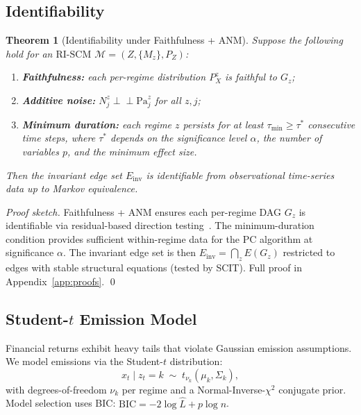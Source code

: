 \documentclass[11pt]{article}
\newtheorem{theorem}{Theorem}
\newcommand{\RISCM}{\text{RI-SCM}}
\newcommand{\cM}{\mathcal{M}}
\begin{document}
\subsection{Identifiability}

\begin{theorem}[Identifiability under Faithfulness + ANM]\label{thm:ident}
Suppose the following hold for an $\RISCM$
$\cM = (Z, \{M_z\}, P_Z)$:
\begin{enumerate}[nosep]
  \item \textbf{Faithfulness:} each per-regime distribution $P^z_X$
        is faithful to $G_z$;
  \item \textbf{Additive noise:} $N^z_j \perp\!\!\!\perp
        \mathrm{Pa}_j^z$ for all $z, j$;
  \item \textbf{Minimum duration:} each regime $z$ persists for at
        least $\tau_{\min} \geq \tau^*$ consecutive time steps, where
        $\tau^*$ depends on the significance level $\alpha$, the
        number of variables $p$, and the minimum effect size.
\end{enumerate}
Then the invariant edge set $E_{\mathrm{inv}}$ is identifiable from
observational time-series data up to Markov equivalence.
\end{theorem}

\noindent\emph{Proof sketch.}
Faithfulness + ANM ensures each per-regime DAG $G_z$ is identifiable
via residual-based direction testing~\cite{zhang2012kernel}.  The
minimum-duration condition provides sufficient within-regime data for
the PC algorithm at significance $\alpha$.  The invariant edge set is
then $E_{\mathrm{inv}} = \bigcap_z E(G_z)$ restricted to edges with
stable structural equations (tested by SCIT).  Full proof in
Appendix~\ref{app:proofs}. \qed

\subsection{Student-$t$ Emission Model}\label{sec:studentt}

Financial returns exhibit heavy tails that violate Gaussian emission
assumptions.  We model emissions via the Student-$t$ distribution:
\begin{equation}\label{eq:studentt}
  x_t \mid z_t = k \;\sim\; t_{\nu_k}(\mu_k, \Sigma_k),
\end{equation}
with degrees-of-freedom $\nu_k$ per regime and a
Normal-Inverse-$\chi^2$ conjugate prior.  Model selection uses BIC:
$\mathrm{BIC} = -2\log \hat{L} + p \log n$.
\end{document}

